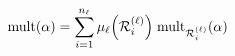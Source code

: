 \begin{equation}\label{Mult}
{{\rm mult}} (\alpha) = \sum_{i=1}^{n_\ell} \mu_\ell \Big({\mathcal R}_i^{(\ell)}\Big) \;
{{\rm mult}}_{{\mathcal R}_i^{(\ell)}} (\alpha)
\end{equation}

